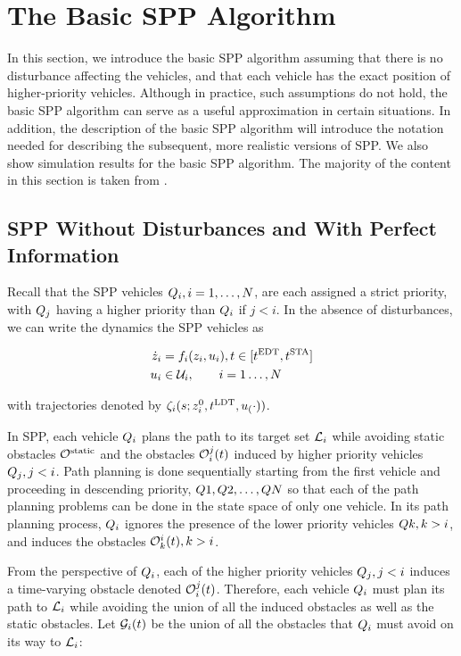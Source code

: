\section{The Basic SPP Algorithm\label{sec:basic}}
In this section, we introduce the basic SPP algorithm assuming that there is no disturbance affecting the vehicles, and that each vehicle has the exact position of higher-priority vehicles. Although in practice, such assumptions do not hold, the basic SPP algorithm can serve as a useful approximation in certain situations. In addition, the description of the basic SPP algorithm will introduce the notation needed for describing the subsequent, more realistic versions of SPP. We also show simulation results for the basic SPP algorithm. The majority of the content in this section is taken from \cite{Chen15}.

\subsection{SPP Without Disturbances and With Perfect Information}
Recall that the SPP vehicles $Q_i, i=1,\ldots,N$, are each assigned a strict priority, with $Q_j$ having a higher priority than $Q_i$ if $j<i$. In the absence of disturbances, we can write the dynamics the SPP vehicles as

\begin{equation}
\label{eq:dyn_no_dstb}
\begin{aligned}
\dot\state_i &= \fdyn_i(\state_i, \ctrl_i), t \in [\edt, \sta] \\
\ctrl_i &\in \cset_i, \qquad i = 1 \ldots, \N
\end{aligned}
\end{equation}

\noindent with trajectories denoted by $\zeta_i(s; z^0_i, t^\text{LDT}, u_(\cdot))$.

In SPP, each vehicle $Q_i$ plans the path to its target set $\mathcal{L}_i$ while avoiding static obstacles $\mathcal{O}^\text{static}$ and the obstacles $\mathcal{O}_i^j(t)$ induced by higher priority vehicles $Q_j, j<i$. Path planning is done sequentially starting from the first vehicle and proceeding in descending priority, $Q{1}, Q{2}, \ldots, Q{N}$ so that each of the path planning problems can be done in the state space of only one vehicle. In its path planning process, $Q_i$ ignores the presence of the lower priority vehicles $Q{k}, k>i$, and induces the obstacles $\mathcal{O}_k^i(t), k>i$.

From the perspective of $Q_i$, each of the higher priority vehicles $Q_j, j<i$ induces a time-varying obstacle denoted $\mathcal{O}_i^j(t)$. Therefore, each vehicle $Q_i$ must plan its path to $\mathcal{L}_i$ while avoiding the union of all the induced obstacles as well as the static obstacles. Let $\mathcal{G}_i(t)$ be the union of all the obstacles that $Q_i$ must avoid on its way to $\mathcal{L}_i$:

